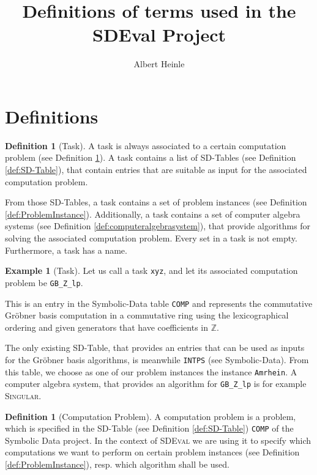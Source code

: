 \documentclass[11pt,a4paper]{amsart}
\numberwithin{equation}{section}
\theoremstyle{definition}
\newtheorem{definition}[theorem]{Definition}
\newtheorem{example}[theorem]{Example}
\newcommand{\ZZ}{{\mathbb{Z}}}
\begin{document}
\title{Definitions of terms used in the SDEval Project}
\author{Albert Heinle}


\maketitle
\section{Definitions}

\begin{definition}[Task]
\label{def:Task}
A task is always associated to a certain computation problem (see
Definition \ref{def:ComputationProblem}). A task contains a list of
SD-Tables (see Definition \ref{def:SD-Table}), that contain entries
that are suitable as input for the associated computation problem.

From those SD-Tables, a task contains a set of problem instances (see
Definition \ref{def:ProblemInstance}). Additionally, a task contains a
set of computer algebra systems (see Definition
\ref{def:computeralgebrasystem}), that provide algorithms for solving the
associated computation problem. Every set in a task is not
empty. Furthermore, a task has a name.
\end{definition}

\begin{example}[Task]
Let us call a task \texttt{xyz}, and let its associated computation
problem be \texttt{GB\_Z\_lp}.

This is an entry in the Symbolic-Data
table \texttt{COMP} and represents the commutative Gr\"obner basis
computation in a commutative ring using the lexicographical ordering
and given generators that have coefficients in $\ZZ$.

The only existing SD-Table, that provides an entries that can be used
as inputs for the Gr\"obner basis algorithms, is meanwhile
\texttt{INTPS} (see Symbolic-Data). From this table, we choose as one
of our problem instances the instance \texttt{Amrhein}. A computer
algebra system, that provides an algorithm for \texttt{GB\_Z\_lp} is
for example \textsc{Singular}.
\end{example}

\begin{definition}[Computation Problem]
\label{def:ComputationProblem}
A computation problem is a problem, which is specified in the SD-Table
(see Definition \ref{def:SD-Table})
\texttt{COMP} of the Symbolic Data project. In the context of
\textsc{SDEval} we are using it to specify which computations
we want to perform on certain problem instances (see Definition
\ref{def:ProblemInstance}), resp. which algorithm shall be used.
\end{definition}
\end{document}

